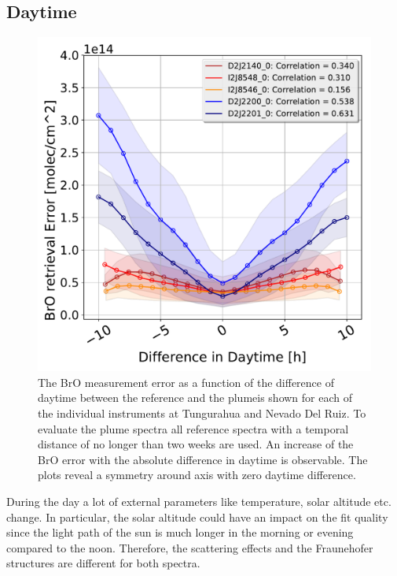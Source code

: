 \subsection{ Daytime \label{chap:daytime}}
	\begin{figure}
	\centering
	\includegraphics[width=0.7\linewidth]{Bilder/DiffDaytimeallInstruments}
	\caption{The BrO measurement error as a function of the difference of daytime between the reference and the plumeis shown for each of the individual instruments at Tungurahua and Nevado Del Ruiz. To evaluate the plume spectra all reference spectra with a temporal distance of no longer than two weeks are used. An increase of the BrO error with the absolute difference in daytime is observable. The plots reveal a symmetry around axis with zero daytime difference. }
	\label{fig:diffdaytime}
\end{figure}
During the day a lot of external parameters like temperature, solar altitude etc. change. In particular, the solar altitude could have an impact on the fit quality since the light path of the sun is much longer in the morning or evening compared to the noon. Therefore, the scattering effects and the Fraunehofer structures are different for both spectra.\\

